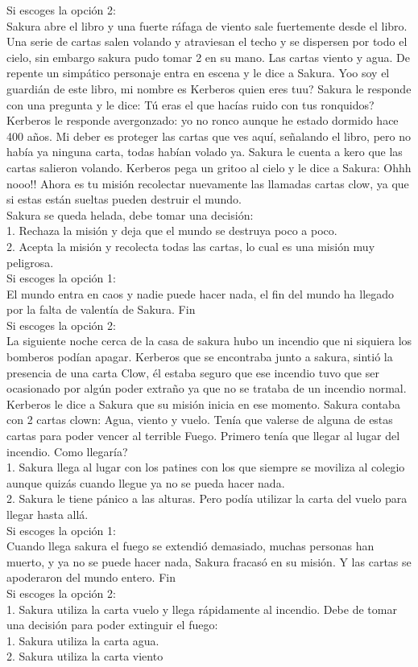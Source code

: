 \documentclass[12pt]{article}
\begin{document}
{{{\begin{flushleft}
Si escoges la opción 2:\\
Sakura abre el libro y una fuerte ráfaga de viento sale fuertemente desde el libro. Una serie de cartas salen volando y atraviesan el techo y se dispersen por todo el cielo, sin embargo sakura pudo tomar 2 en su mano. Las cartas viento y agua. De repente un simpático personaje entra en escena y le dice a Sakura.  Yoo soy el guardián de este libro, mi nombre es Kerberos quien eres tuu?
Sakura le responde con una pregunta y le dice: Tú eras el que hacías ruido con tus ronquidos?
Kerberos le responde avergonzado: yo no ronco aunque he estado dormido hace 400 años. Mi deber es proteger las cartas que ves aquí, señalando el libro, pero no había ya ninguna carta, todas habían volado ya.
Sakura le cuenta a kero que las cartas salieron volando.
Kerberos pega un gritoo al cielo y le dice a Sakura: Ohhh nooo!! Ahora es tu misión recolectar nuevamente las llamadas cartas clow, ya que si estas están sueltas pueden destruir el mundo.\\
Sakura se queda helada, debe tomar una decisión:\\
1.	Rechaza la misión y deja que el mundo se destruya poco a poco.\\
2.	Acepta la misión y recolecta todas las cartas, lo cual es una misión muy peligrosa.\\
Si escoges la opción 1:\\
El mundo entra en caos y nadie puede hacer nada, el fin del mundo ha llegado por la falta de valentía de Sakura. Fin\\
Si escoges la opción 2:\\
La siguiente noche cerca de la casa de sakura hubo un incendio que ni siquiera los bomberos podían apagar. Kerberos que se encontraba junto a sakura, sintió la presencia de una carta Clow, él estaba seguro que ese incendio tuvo que ser ocasionado por algún poder extraño ya que no se trataba de un incendio normal.
Kerberos le dice a Sakura que su misión inicia en ese momento. Sakura contaba con 2 cartas clown: Agua, viento y vuelo.
Tenía que valerse de alguna de estas cartas para poder vencer al terrible Fuego.
Primero tenía que llegar al lugar del incendio. Como llegaría?\\
1.	Sakura llega al lugar con los patines con los que siempre se moviliza al colegio aunque  quizás cuando llegue ya no se pueda hacer nada.\\
2.	Sakura le tiene pánico a las alturas. Pero podía utilizar la carta del vuelo para llegar hasta allá.\\
Si escoges la opción 1:\\
Cuando llega sakura el fuego se extendió demasiado, muchas personas han muerto, y ya no se puede hacer nada, Sakura fracasó en su misión. Y las cartas se apoderaron del mundo entero. Fin\\
Si escoges la opción 2:\\
1.	Sakura utiliza la carta vuelo y llega rápidamente al incendio. Debe de tomar una decisión para poder extinguir el fuego:\\
1.	Sakura utiliza la carta agua.\\
2.	Sakura utiliza la carta viento\\


\end{flushleft}}}}
\end{document}
